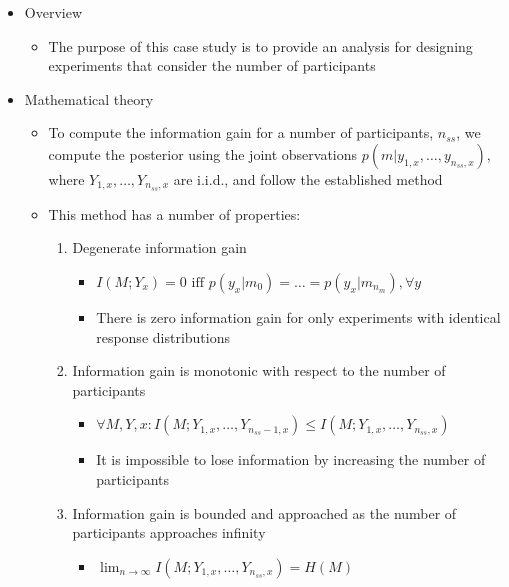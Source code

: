 \documentclass[11pt]{article}
\begin{document}
    \begin{itemize}
        \item Overview
            \begin{itemize}
                \item The purpose of this case study is to provide an analysis for designing experiments that consider the number of participants
            \end{itemize}
        \item Mathematical theory %
            \begin{itemize}
                \item To compute the information gain for a number of participants, $n_{ss}$, we compute the posterior using the joint observations $p(m|y_{1,x}, \dots, y_{n_{ss},x})$, where ${Y_{1,x}, \dots, Y_{n_{ss},x}}$ are i.i.d., and follow the established method
                \item This method has a number of properties:
                    \begin{enumerate}
                        \item Degenerate information gain
                            \begin{itemize}
                                \item $ I(M;Y_{x}) = 0 \text{ iff } p(y_x|m_0) = \dots = p(y_x|m_{n_m}),  \forall y$
                                \item There is zero information gain for only experiments with identical response distributions
                            \end{itemize}
                        \item Information gain is monotonic with respect to the number of participants
                            \begin{itemize}
                                \item $\forall M, Y, x: I(M;Y_{1,x}, \dots, Y_{n_{ss}-1,x}) \leq I(M;Y_{1,x}, \dots, Y_{n_{ss},x})$
                                \item It is impossible to lose information by increasing the number of participants 
                            \end{itemize}
                        \item Information gain is bounded and approached as the number of participants approaches infinity
                            \begin{itemize}
                                \item $\lim_{n \rightarrow \infty} I(M;Y_{1,x}, \dots, Y_{n_{ss},x}) = H(M)$

\end{itemize}
\end{enumerate}
\end{itemize}
\end{itemize}
\end{document}
